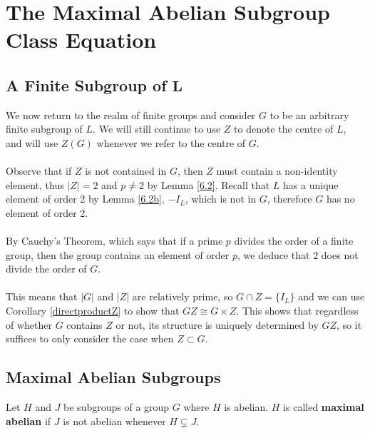 \chapter[The Maximal Abelian Subgroup Class Equation]{The Maximal Abelian Subgroup Class Equation}\label{Ch6_MaximalAbelianSubgroupClassEquation}

\section[A finite subgroup of $L$]{A Finite Subgroup of $\pmb{L}$}

We now return to the realm of finite groups and consider $G$ to be an arbitrary finite subgroup of $L$. We will still continue to use $Z$ to denote the centre of $L$, and will use $Z(G)$ whenever we refer to the centre of $G$. \\
\\
Observe that if $Z$ is not contained in $G$, then $Z$ must contain a non-identity element, thus $|Z| = 2$ and $p \neq 2$ by Lemma \ref{6.2}. Recall that $L$ has a unique element of order 2 by Lemma \ref{6.2b}, $- I_L$, which is not in $G$, therefore $G$ has no element of order 2. \\
\\
By Cauchy's Theorem, which says that if a prime $p$ divides the order of a finite group, then the group contains an element of order $p$, we deduce that 2 does not divide the order of $G$. \\
\\
This means that $|G|$ and $|Z|$ are relatively prime, so $G \cap Z = \{ I_L \}$ and we can use Corollary \ref{directproductZ} to show that $GZ \cong G \times Z$. This shows that regardless of whether $G$ contains $Z$ or not, its structure is uniquely determined by $GZ$, so it suffices to only consider the case when $Z \subset G$. 

\section{Maximal Abelian Subgroups}

\begin{definition}
\label{IsMaximalAbelian}
\leanok
Let $H$ and $J$ be subgroups of a group $G$ where $H$ is abelian. $H$ is called \textbf{maximal abelian} if $J$ is not abelian whenever $H \subsetneq J$.
\end{definition}


